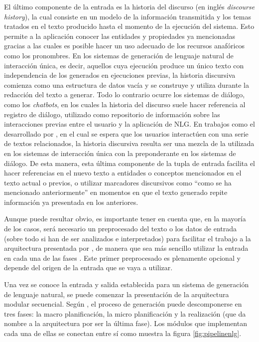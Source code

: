 El último componente de la entrada es la historia del discurso (en inglés \textit{discourse history}), la cual consiste en un modelo de la información transmitida y los temas tratados en el texto producido hasta el momento de la ejecución del sistema. Esto permite a la aplicación conocer las entidades y propiedades ya mencionadas gracias a las cuales es posible hacer un uso adecuado de los recursos anafóricos como los pronombres. En los sistemas de generación de lenguaje natural de interacción única, es decir, aquellos cuya ejecución produce un único texto con independencia de los generados en ejecuciones previas, la historia discursiva comienza como una estructura de datos vacía y se construye y utiliza durante la redacción del texto a generar. Todo lo contrario ocurre los sistemas de diálogo, como los \textit{chatbots}, en los cuales la historia del discurso suele hacer referencia al registro de diálogo, utilizado como repositorio de información sobre las interacciones previas entre el usuario y la aplicación de NLG. En trabajos como el desarrollado por \cite{milosavljevic1996text}, en el cual se espera que los usuarios interactúen con una serie de textos relacionados, la historia discursiva resulta ser una mezcla de la utilizada en los sistemas de interacción única con la preponderante en los sistemas de diálogo. De esta manera, esta última componente de la tupla de entrada facilita el hacer referencias en el nuevo texto a entidades o conceptos mencionados en el texto actual o previos, o utilizar marcadores discursivos como ``como se ha mencionado anteriormente'' en momentos en que el texto generado repite información ya presentada en los anteriores.

Aunque puede resultar obvio, es importante tener en cuenta que, en la mayoría de los casos, será necesario un preprocesado del texto o los datos de entrada (sobre todo si han de ser analizados e interpretados) para facilitar el trabajo a la arquitectura presentada por \cite{biblia}, de manera que sea más sencillo utilizar la entrada en cada una de las fases \citep{han2011data}. Este primer preprocesado es plenamente opcional y depende del origen de la entrada que se vaya a utilizar.

Una vez se conoce la entrada y salida establecida para un sistema de generación de lenguaje natural, se puede comenzar la presentación de la arquitectura modular secuencial. Según \cite{biblia}, el proceso de generación puede descomponerse en tres fases: la macro planificación, la micro planificación y la realización (que da nombre a la arquitectura por ser la última fase). Los módulos que implementan cada una de ellas se conectan entre sí como muestra la figura \ref{fig:pipelinenlg}.

